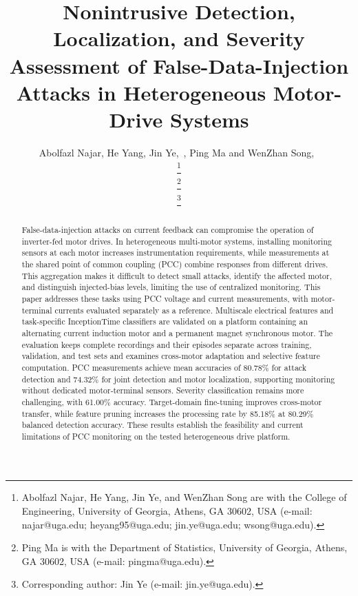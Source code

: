\documentclass[letterpaper,journal]{IEEEtran}
\begin{document}
\title{Nonintrusive Detection, Localization, and Severity Assessment of False-Data-Injection Attacks in Heterogeneous Motor-Drive Systems
}

\author{%
    Abolfazl Najar, He Yang, Jin Ye,~,  Ping Ma and WenZhan Song,~%

    \thanks{Abolfazl Najar, He Yang, Jin Ye, and WenZhan Song are with the College of Engineering, University of Georgia, Athens, GA 30602, USA (e-mail: najar@uga.edu; heyang95@uga.edu; jin.ye@uga.edu; wsong@uga.edu).}%

    \thanks{Ping Ma is with the Department of Statistics, University of Georgia, Athens, GA 30602, USA (e-mail: pingma@uga.edu).}%

    \thanks{Corresponding author: Jin Ye (e-mail: jin.ye@uga.edu).}%

}

\maketitle

\begin{abstract}
False-data-injection attacks on current feedback can compromise the operation of inverter-fed motor drives. In heterogeneous multi-motor systems, installing monitoring sensors at each motor increases instrumentation requirements, while measurements at the shared point of common coupling (PCC) combine responses from different drives. This aggregation makes it difficult to detect small attacks, identify the affected motor, and distinguish injected-bias levels, limiting the use of centralized monitoring.
This paper addresses these tasks using PCC voltage and current measurements, with motor-terminal currents evaluated separately as a reference. Multiscale electrical features and task-specific InceptionTime classifiers are validated on a platform containing an alternating current induction motor and a permanent magnet synchronous motor. The evaluation keeps complete recordings and their episodes separate across training, validation, and test sets and examines cross-motor adaptation and selective feature computation.
PCC measurements achieve mean accuracies of 80.78\% for attack detection and 74.32\% for joint detection and motor localization, supporting monitoring without dedicated motor-terminal sensors. Severity classification remains more challenging, with 61.00\% accuracy. Target-domain fine-tuning improves cross-motor transfer, while feature pruning increases the processing rate by 85.18\% at 80.29\% balanced detection accuracy. These results establish the feasibility and current limitations of PCC monitoring on the tested heterogeneous drive platform.
\end{abstract}
\end{document}
